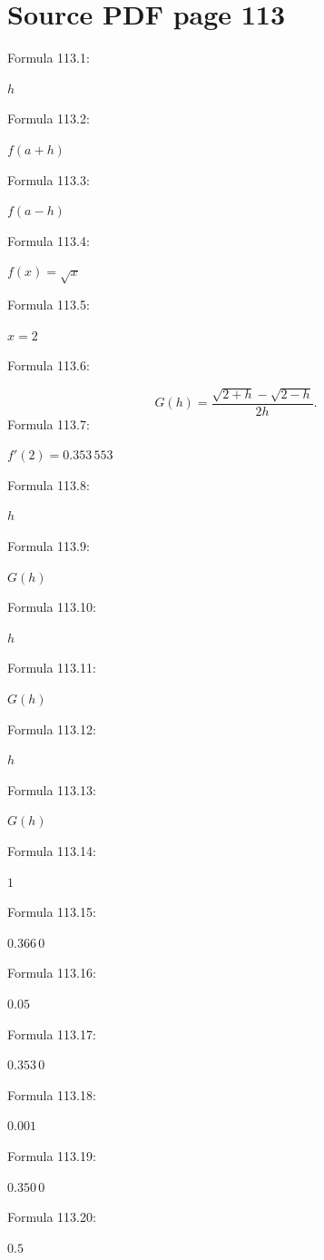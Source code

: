 \documentclass[11pt]{article}
\begin{document}
\section*{Source PDF page 113}
\noindent Formula 113.1:\par
$h$\par
\noindent Formula 113.2:\par
$f(a+h)$\par
\noindent Formula 113.3:\par
$f(a-h)$\par
\noindent Formula 113.4:\par
$f(x)=\sqrt{x}$\par
\noindent Formula 113.5:\par
$x=2$\par
\noindent Formula 113.6:\par
\[
G(h)=\frac{\sqrt{2+h}-\sqrt{2-h}}{2h}.
\]
\noindent Formula 113.7:\par
$f'(2)=0.353\,553$\par
\noindent Formula 113.8:\par
$h$\par
\noindent Formula 113.9:\par
$G(h)$\par
\noindent Formula 113.10:\par
$h$\par
\noindent Formula 113.11:\par
$G(h)$\par
\noindent Formula 113.12:\par
$h$\par
\noindent Formula 113.13:\par
$G(h)$\par
\noindent Formula 113.14:\par
$1$\par
\noindent Formula 113.15:\par
$0.366\,0$\par
\noindent Formula 113.16:\par
$0.05$\par
\noindent Formula 113.17:\par
$0.353\,0$\par
\noindent Formula 113.18:\par
$0.001$\par
\noindent Formula 113.19:\par
$0.350\,0$\par
\noindent Formula 113.20:\par
$0.5$\par
\end{document}
